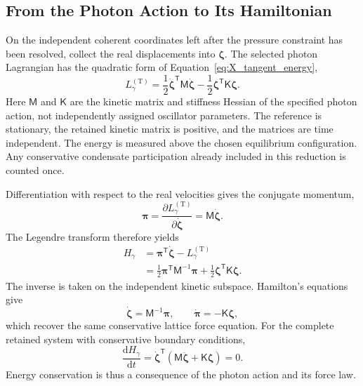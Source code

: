 \subsection{From the Photon Action to Its Hamiltonian}

On the independent coherent coordinates left after the pressure constraint has been resolved, collect the real displacements into $\boldsymbol\zeta$. The selected photon Lagrangian has the quadratic form of Equation~\eqref{eq:X_tangent_energy},
\begin{equation}
    L_{\gamma}^{(\mathrm T)}
    =\frac12\dot{\boldsymbol\zeta}^{\mathsf T}
    \mathsf M\dot{\boldsymbol\zeta}
    -\frac12\boldsymbol\zeta^{\mathsf T}
    \mathsf K\boldsymbol\zeta.
\end{equation}
Here $\mathsf M$ and $\mathsf K$ are the kinetic matrix and stiffness Hessian of the specified photon action, not independently assigned oscillator parameters. The reference is stationary, the retained kinetic matrix is positive, and the matrices are time independent. The energy is measured above the chosen equilibrium configuration. Any conservative condensate participation already included in this reduction is counted once.

Differentiation with respect to the real velocities gives the conjugate momentum,
\begin{equation}
    \boldsymbol\pi
    =\frac{\partial L_{\gamma}^{(\mathrm T)}}
    {\partial\dot{\boldsymbol\zeta}}
    =\mathsf M\dot{\boldsymbol\zeta}.
\end{equation}
The Legendre transform therefore yields
\begin{align}
    H_{\gamma}
    &=\boldsymbol\pi^{\mathsf T}\dot{\boldsymbol\zeta}
      -L_{\gamma}^{(\mathrm T)}
    \nonumber\\
    &=\boxed{
    \frac12\boldsymbol\pi^{\mathsf T}\mathsf M^{-1}\boldsymbol\pi
    +\frac12\boldsymbol\zeta^{\mathsf T}\mathsf K\boldsymbol\zeta
    }.
\end{align}
The inverse is taken on the independent kinetic subspace. Hamilton's equations give
\begin{equation}
    \dot{\boldsymbol\zeta}=\mathsf M^{-1}\boldsymbol\pi,
    \qquad
    \dot{\boldsymbol\pi}=-\mathsf K\boldsymbol\zeta,
\end{equation}
which recover the same conservative lattice force equation. For the complete retained system with conservative boundary conditions,
\begin{equation}
    \frac{\mathrm dH_{\gamma}}{\mathrm dt}
    =\dot{\boldsymbol\zeta}^{\mathsf T}
    \left(\mathsf M\ddot{\boldsymbol\zeta}
    +\mathsf K\boldsymbol\zeta\right)=0.
\end{equation}
Energy conservation is thus a consequence of the photon action and its force law.

